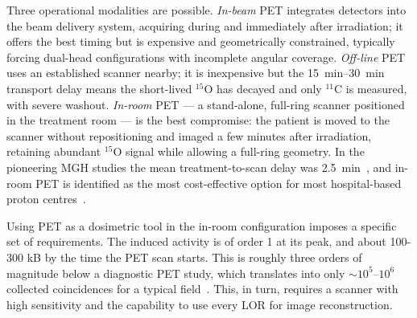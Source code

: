 \documentclass{iopjournal}
\begin{document}

Three operational modalities are possible.
\emph{In-beam} PET integrates detectors into the beam delivery system,
acquiring during and immediately after irradiation; it offers the best timing
but is expensive and geometrically constrained, typically forcing dual-head
configurations with incomplete angular coverage. \emph{Off-line} PET uses an
established scanner nearby; it is inexpensive but the \SIrange{15}{30}{\minute}
transport delay means the short-lived $^{15}$O has decayed and only $^{11}$C is
measured, with severe washout. \emph{In-room} PET --- a stand-alone,
full-ring scanner positioned in the treatment room --- is the best compromise:
the patient is moved to the scanner without repositioning and imaged a few
minutes after irradiation, retaining abundant $^{15}$O signal while allowing a
full-ring geometry. In the pioneering MGH studies the mean treatment-to-scan
delay was \SI{2.5}{\minute}~\cite{zhu2011monitoring,min2013clinical}, and
in-room PET is identified as the most cost-effective option for most
hospital-based proton centres~\cite{zhu2013proton}.

Using PET as a dosimetric tool in the in-room configuration imposes a specific
set of requirements. The induced activity is of order \SI{1}{\MBq} at its
peak, and about 100-300 kB by the time the PET scan starts. This is roughly three orders of magnitude below a diagnostic PET study, which
translates into only $\sim 10^{5}$--$10^{6}$ collected coincidences for a
typical field~\cite{parodi2008comparison}. This, in turn, requires a scanner with high sensitivity and the capability to use every LOR for image reconstruction. %
 
\end{document}
